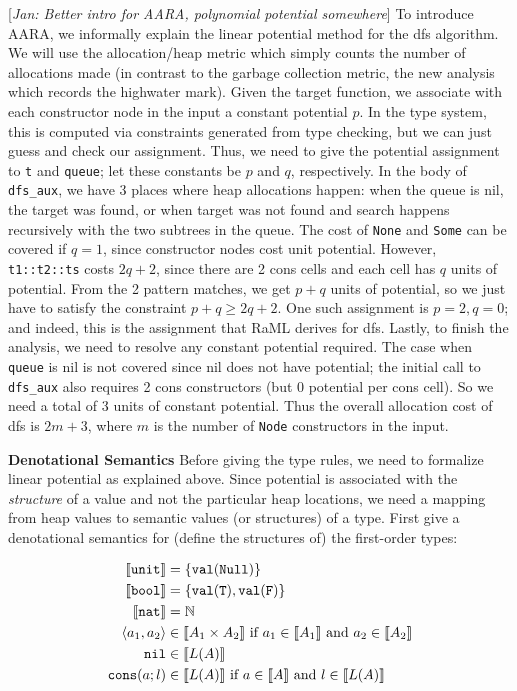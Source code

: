 \documentclass{easychair}
\newcommand{\irl}[1]{\mathtt{#1}}
\newcounter{rule}
\newcommand{\denote}[1]{\llbracket#1\rrbracket}
\newcommand{\val}[1]{\irl{val}(#1)}
\newcommand{\jan}[1]{{\color{red} [\emph{Jan: #1}]}}
\theoremstyle{definition}
\begin{document}
\jan{Better intro for AARA, polynomial potential somewhere}
To introduce AARA, we informally explain the linear potential method for the dfs algorithm.
We will use the allocation/heap metric which simply counts the number of allocations made 
(in contrast to the garbage collection metric, the new analysis which records the highwater mark). 
Given the target function, we associate with each constructor node in the input a
constant potential $p$. 
In the type system, this is computed via constraints generated from type checking, but we can 
just guess and check our assignment. 
Thus, we need to give the potential assignment to \texttt{t} and \texttt{queue}; let these
constants be $p$ and $q$, respectively.
In the body of \texttt{dfs\_aux}, we have
3 places where heap allocations happen: when the queue is nil, the target was found, 
or when target was not found and search happens recursively with the two subtrees in the queue.
The cost of \texttt{None} and \texttt{Some} can be covered if $q = 1$, since constructor nodes
cost unit potential. However, \texttt{t1::t2::ts} costs $2q+2$, since there are 2 cons cells and 
each cell has $q$ units of potential. From the 2 pattern matches, we get $p+q$ units of potential,
so we just have to satisfy the constraint $p+q \ge 2q+2$. One such assignment is $p = 2, q = 0$; 
and indeed, this is the assignment that RaML derives for dfs. Lastly, to finish the analysis,
we need to resolve any constant potential required. The case when \texttt{queue} is nil is 
not covered since nil does not have potential; the initial call to \texttt{dfs\_aux} also 
requires 2 cons constructors (but 0 potential per cons cell). So we need a total of 3 units 
of constant potential. Thus the overall allocation cost of dfs is $2m+3$, where $m$ is the number 
of \texttt{Node} constructors in the input.

\textbf{Denotational Semantics}
Before giving the type rules, we need to formalize linear potential as explained above.
Since potential is associated with the \emph{structure} of a value and not the particular heap 
locations, we need a mapping from
heap values to semantic values (or structures) of a type. 
First give a denotational semantics for (define the structures of) the first-order types: 

\begin{align*}
	\denote{\unittyabt} &= \{\val{\irl{Null}}\}\\
	\denote{\booltyabt} &= \{\val{\irl{T}}, \val{\irl{F}}\}\\
	\denote{\irl{nat}} &= \mathbb{N}\\
\pairexcst{a_1}{a_2} &\in \denote{\prodtycst{A_1}{A_2}} 
	\text{ if } a_1 \in \denote{A_1} \text{ and } a_2 \in \denote{A_2}\\
\nilexcst &\in \denote{L(A)}\\
\consexcst{a}{l} &\in \denote{L(A)} \text{ if } a \in \denote{A} \text{ and } l \in \denote{L(A)}\\
\end{align*}
\end{document}

